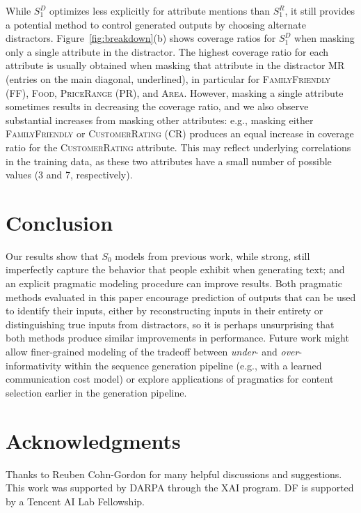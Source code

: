 \documentclass[11pt,a4paper]{article}
\newcommand{\basespk}[0]{$S_0$\xspace}
\newcommand{\pragd}[0]{$S_1^D$\xspace}
\newcommand{\pragr}[0]{$S_1^R$\xspace}
\newcommand{\eg}{e.g., }
\begin{document}
While \pragd optimizes less explicitly for attribute mentions than \pragr, it still provides a potential method to control generated outputs by choosing alternate distractors. Figure~\ref{fig:breakdown}(b) shows coverage ratios for \pragd when masking only a single attribute in the distractor.
The highest coverage ratio for each attribute is usually obtained when masking that attribute in the distractor MR (entries on the main diagonal, underlined), in particular for  \textsc{FamilyFriendly} (\textsc{FF}), \textsc{Food}, \textsc{PriceRange} (\textsc{PR}), and \textsc{Area}. However, masking a single attribute sometimes results in decreasing the coverage ratio, and we also observe substantial increases from masking other attributes: \eg masking either \textsc{FamilyFriendly} or \textsc{CustomerRating} (\textsc{CR}) produces an equal increase in coverage ratio for the \textsc{CustomerRating} attribute. This may reflect underlying correlations in the training data, as these two attributes have a small number of possible values (3 and 7, respectively). 


 \section{Conclusion}

Our results show that
\basespk models from previous work, while strong,
still imperfectly capture the behavior that people exhibit when generating text; 
and an explicit pragmatic modeling procedure can improve results.
Both pragmatic methods evaluated in this paper encourage prediction of outputs that can be used to identify their inputs, either by reconstructing inputs in their entirety or distinguishing true inputs from distractors, so it is perhaps unsurprising that both methods produce similar improvements in performance. 
Future work might allow finer-grained modeling of the tradeoff between \emph{under}- and \emph{over}-informativity within the sequence generation pipeline (\eg with a learned communication cost model) or explore applications of pragmatics for content selection earlier in the generation pipeline.





 


\section*{Acknowledgments}
Thanks to Reuben Cohn-Gordon for many helpful discussions and suggestions. This work was supported
by DARPA through the XAI program. DF is supported by a Tencent AI Lab Fellowship.
\end{document}
